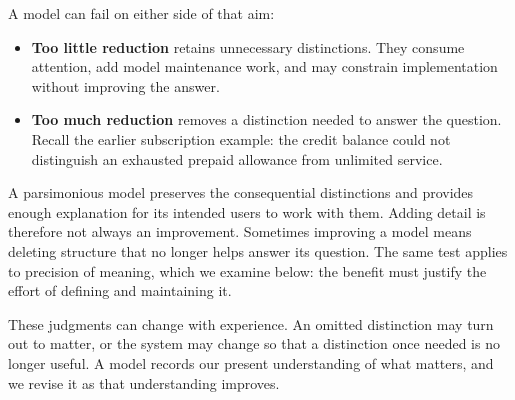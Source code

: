 
A model can fail on either side of that aim:

\begin{itemize}
\tightlist
\item
  \textbf{Too little reduction} retains unnecessary distinctions. They consume attention, add model maintenance work, and may constrain implementation without improving the answer.
\item
  \textbf{Too much reduction} removes a distinction needed to answer the question. Recall the earlier subscription example: the credit balance could not distinguish an exhausted prepaid allowance from unlimited service.
\end{itemize}


A parsimonious model preserves the consequential distinctions and provides enough explanation for its intended users to work with them. Adding detail is therefore not always an improvement. Sometimes improving a model means deleting structure that no longer helps answer its question. The same test applies to precision of meaning, which we examine below: the benefit must justify the effort of defining and maintaining it.


These judgments can change with experience. An omitted distinction may turn out to matter, or the system may change so that a distinction once needed is no longer useful. A model records our present understanding of what matters, and we revise it as that understanding improves.


